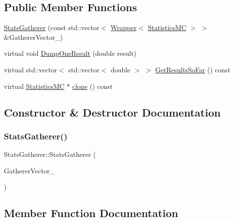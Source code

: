 \subsection*{Public Member Functions}
\begin{DoxyCompactItemize}
\item 
\hyperlink{classStatsGatherer_ae253718082ac0a7dbca358780d3107cd}{Stats\+Gatherer} (const std\+::vector$<$ \hyperlink{classWrapper}{Wrapper}$<$ \hyperlink{classStatisticsMC}{Statistics\+MC} $>$ $>$ \&Gatherer\+Vector\+\_\+)
\item 
virtual void \hyperlink{classStatsGatherer_ae7f7e9ad4a0b0491dbcbcc27f93a89ff}{Dump\+One\+Result} (double result)
\item 
virtual std\+::vector$<$ std\+::vector$<$ double $>$ $>$ \hyperlink{classStatsGatherer_a61205b038d5c707a18660dc6cb1212d6}{Get\+Results\+So\+Far} () const
\item 
virtual \hyperlink{classStatisticsMC}{Statistics\+MC} $\ast$ \hyperlink{classStatsGatherer_a07a78e389d948bfc0809ccf57c0dd811}{clone} () const
\end{DoxyCompactItemize}


\subsection{Constructor \& Destructor Documentation}
\hypertarget{classStatsGatherer_ae253718082ac0a7dbca358780d3107cd}{}\label{classStatsGatherer_ae253718082ac0a7dbca358780d3107cd} 
\subsubsection{\texorpdfstring{Stats\+Gatherer()}{StatsGatherer()}}
{\footnotesize\ttfamily Stats\+Gatherer\+::\+Stats\+Gatherer (\begin{DoxyParamCaption}\item[{const std\+::vector$<$ \hyperlink{classWrapper}{Wrapper}$<$ \hyperlink{classStatisticsMC}{Statistics\+MC} $>$ $>$ \&}]{Gatherer\+Vector\+\_\+ }\end{DoxyParamCaption})}



\subsection{Member Function Documentation}
\hypertarget{classStatsGatherer_a07a78e389d948bfc0809ccf57c0dd811}{}\label{classStatsGatherer_a07a78e389d948bfc0809ccf57c0dd811} 
